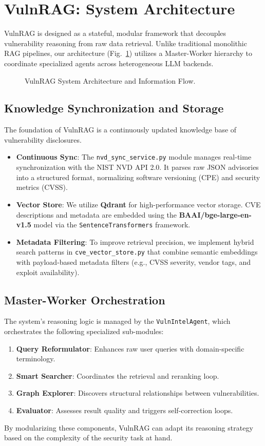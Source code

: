 \section{VulnRAG: System Architecture}
\label{sec:design}

VulnRAG is designed as a stateful, modular framework that decouples vulnerability reasoning from raw data retrieval. Unlike traditional monolithic RAG pipelines, our architecture (Fig.~\ref{fig:arch}) utilizes a Master-Worker hierarchy to coordinate specialized agents across heterogeneous LLM backends.

\begin{figure}[htbp]
    \centering
    \resizebox{\columnwidth}{!}{}
    \caption{VulnRAG System Architecture and Information Flow.}
    \label{fig:arch}
\end{figure}

\subsection{Knowledge Synchronization and Storage}
The foundation of VulnRAG is a continuously updated knowledge base of vulnerability disclosures. 
\begin{itemize}
    \item \textbf{Continuous Sync}: The \texttt{nvd\_sync\_service.py} module manages real-time synchronization with the NIST NVD API 2.0. It parses raw JSON advisories into a structured format, normalizing software versioning (CPE) and security metrics (CVSS).
    \item \textbf{Vector Store}: We utilize \textbf{Qdrant} for high-performance vector storage. CVE descriptions and metadata are embedded using the \textbf{BAAI/bge-large-en-v1.5} model via the \texttt{SentenceTransformers} framework.
    \item \textbf{Metadata Filtering}: To improve retrieval precision, we implement hybrid search patterns in \texttt{cve\_vector\_store.py} that combine semantic embeddings with payload-based metadata filters (e.g., CVSS severity, vendor tags, and exploit availability).
\end{itemize}

\subsection{Master-Worker Orchestration}
The system's reasoning logic is managed by the \texttt{VulnIntelAgent}, which orchestrates the following specialized sub-modules:
\begin{enumerate}
    \item \textbf{Query Reformulator}: Enhances raw user queries with domain-specific terminology.
    \item \textbf{Smart Searcher}: Coordinates the retrieval and reranking loop.
    \item \textbf{Graph Explorer}: Discovers structural relationships between vulnerabilities.
    \item \textbf{Evaluator}: Assesses result quality and triggers self-correction loops.
\end{enumerate}

By modularizing these components, VulnRAG can adapt its reasoning strategy based on the complexity of the security task at hand.
